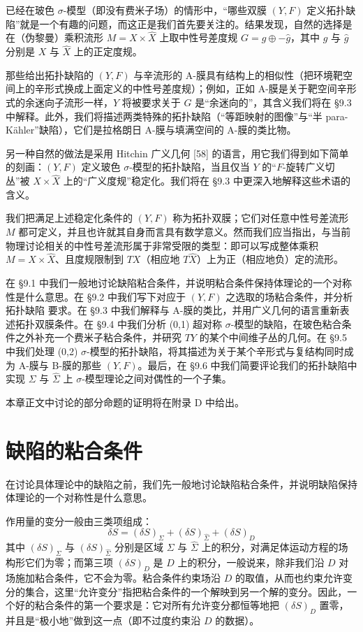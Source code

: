 已经在玻色 $\sigma$-模型（即没有费米子场）的情形中，“哪些双膜 $(Y,F)$ 定义拓扑缺陷”就是一个有趣的问题，而这正是我们首先要关注的。结果发现，自然的选择是在（伪黎曼）乘积流形 $M=X\times\hat X$ 上取中性号差度规 $G=g\oplus-\hat g$，其中 $g$ 与 $\hat g$ 分别是 $X$ 与 $\hat X$ 上的正定度规。

那些给出拓扑缺陷的 $(Y,F)$ 与辛流形的 A-膜具有结构上的相似性（把环境靶空间上的辛形式换成上面定义的中性号差度规）；例如，正如 A-膜是关于靶空间辛形式的余迷向子流形一样，$Y$ 将被要求关于 $G$ 是“余迷向的”，其含义我们将在 §9.3 中解释。此外，我们将描述两类特殊的拓扑缺陷（“等距映射的图像”与“半 para-Kähler”缺陷），它们是拉格朗日 A-膜与填满空间的 A-膜的类比物。

另一种自然的做法是采用 Hitchin 广义几何 [58] 的语言，用它我们得到如下简单的刻画：$(Y,F)$ 定义玻色 $\sigma$-模型的拓扑缺陷，当且仅当 $Y$ 的“$F$-旋转广义切丛”被 $X\times\hat X$ 上的“广义度规”稳定化。我们将在 §9.3 中更深入地解释这些术语的含义。

我们把满足上述稳定化条件的 $(Y,F)$ 称为拓扑双膜；它们对任意中性号差流形 $M$ 都可定义，并且也许就其自身而言具有数学意义。然而我们应当指出，与当前物理讨论相关的中性号差流形属于非常受限的类型：即可以写成整体乘积 $M=X\times\hat X$、且度规限制到 $TX$（相应地 $T\hat X$）上为正（相应地负）定的流形。

在 §9.1 中我们一般地讨论缺陷粘合条件，并说明粘合条件保持体理论的一个对称性是什么意思。在 §9.2 中我们写下对应于 $(Y,F)$ 之选取的场粘合条件，并分析拓扑缺陷
要求。在 §9.3 中我们解释与 A-膜的类比，并用广义几何的语言重新表述拓扑双膜条件。在 §9.4 中我们分析 (0,1) 超对称 $\sigma$-模型的缺陷，在玻色粘合条件之外补充一个费米子粘合条件，并研究 $TY$ 的某个中间维子丛的几何。在 §9.5 中我们处理 (0,2) $\sigma$-模型的拓扑缺陷，将其描述为关于某个辛形式与复结构同时成为 A-膜与 B-膜的那些 $(Y,F)$。最后，在 §9.6 中我们简要评论我们的拓扑缺陷中实现 $\Sigma$ 与 $\hat\Sigma$ 上 $\sigma$-模型理论之间对偶性的一个子集。

本章正文中讨论的部分命题的证明将在附录 D 中给出。

\section{缺陷的粘合条件}

在讨论具体理论中的缺陷之前，我们先一般地讨论缺陷粘合条件，并说明缺陷保持体理论的一个对称性是什么意思。

作用量的变分一般由三类项组成：
\[
\delta S=(\delta S)_\Sigma+(\delta S)_{\hat\Sigma}+(\delta S)_D
\]
其中 $(\delta S)_\Sigma$ 与 $(\delta S)_{\hat\Sigma}$ 分别是区域 $\Sigma$ 与 $\hat\Sigma$ 上的积分，对满足体运动方程的场构形它们为零；而第三项 $(\delta S)_D$ 是 $D$ 上的积分，一般说来，除非我们沿 $D$ 对场施加粘合条件，它不会为零。粘合条件约束场沿 $D$ 的取值，从而也约束允许变分的集合，这里“允许变分”指把粘合条件的一个解映到另一个解的变分。因此，一个好的粘合条件的第一个要求是：它对所有允许变分都恒等地把 $(\delta S)_D$ 置零，并且是“极小地”做到这一点（即不过度约束沿 $D$ 的数据）。

